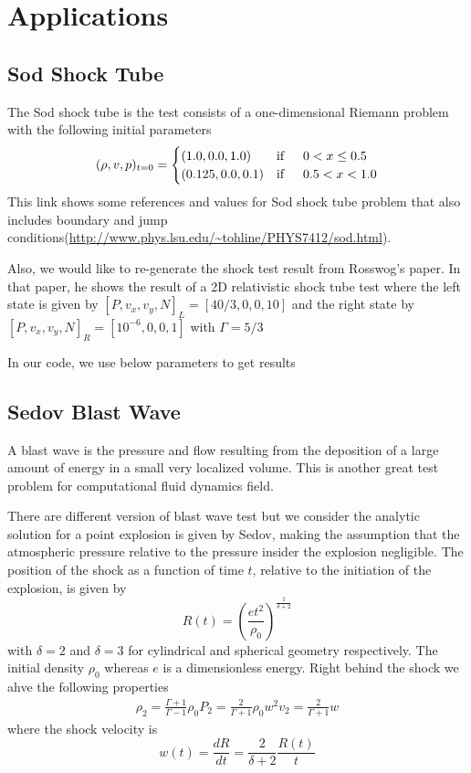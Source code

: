 \documentclass[notes.tex]{subfiles}
\begin{document}
\section{Applications}

\subsection{Sod Shock Tube}
The Sod shock tube is the test consists of a one-dimensional Riemann problem with the following initial parameters
\begin{equation}
(\rho, v, p)_{t=0} = \begin{cases}
(1.0,0.0,1.0) & \text{if} \indent 0 < x \leq 0.5 \\
(0.125,0.0,0.1) & \text{if} \indent 0.5 < x < 1.0
\end{cases}
\end{equation}
This link shows some references and values for Sod shock tube problem that also includes boundary and jump conditions(\url{http://www.phys.lsu.edu/~tohline/PHYS7412/sod.html}).

Also, we would like to re-generate the shock test result from Rosswog's paper. In that paper, he shows the result of a 2D relativistic shock tube test where the left state is given by $[P, v_x, v_y, N]_L = [40/3,0,0,10]$ and the right state by $[P, v_x, v_y, N]_R = [10^{-6},0,0,1]$ with $\Gamma = 5/3$

In our code, we use below parameters to get results

\subsection{Sedov Blast Wave}
A blast wave is the pressure and flow resulting from the deposition of a large amount of energy in a small very localized volume. This is another great test problem for computational fluid dynamics field.

There are different version of blast wave test but we consider the analytic solution for a point explosion is given by Sedov, making the assumption that the atmospheric pressure relative to the pressure insider the explosion negligible. The position of the shock as a function of time $t$, relative to the initiation of the explosion, is given by
\begin{equation}
R(t) = \left( \frac{e t^2}{\rho_0} \right)^{\frac{1}{\delta+2}}
\end{equation}
with $\delta = 2$ and $\delta = 3$ for cylindrical and spherical geometry respectively. The initial density $\rho_0$ whereas $e$ is a dimensionless energy. Right behind the shock we ahve the following properties
\begin{align}
\rho_2 = \frac{\Gamma +1}{\Gamma-1} \rho_0
P_2 = \frac{2}{\Gamma+1} \rho_0 w^2
v_2 = \frac{2}{\Gamma+1} w
\end{align}
where the shock velocity is
\begin{equation}
w(t) = \frac{d R}{dt} = \frac{2}{\delta+2} \frac{R(t)}{t}
\end{equation}
\end{document}
